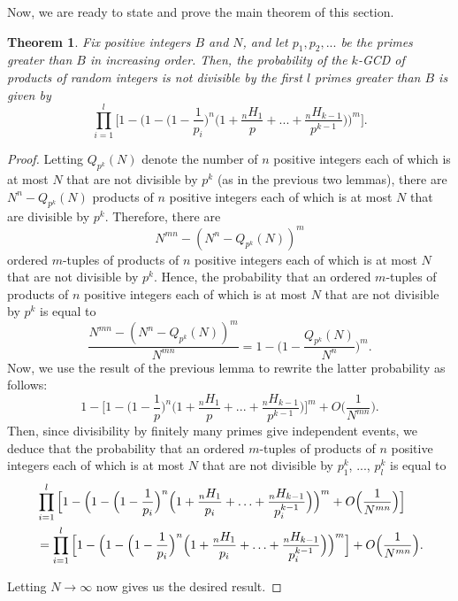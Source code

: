 \documentclass[12pt]{amsart}
\newtheorem{theorem}{Theorem}[subsection]
\theoremstyle{definition}
\begin{document}
Now, we are ready to state and prove the main theorem of this section.

\begin{theorem}
	Fix positive integers $B$ and $N$, and let $p_1, p_2, ...$ be the primes greater than $B$ in increasing order. Then, the probability of the $k$-GCD of products of random integers is not divisible by the first $l$ primes greater than $B$ is given by 
	$$\prod_{i=1}^{l} \Big[1 - \Big(1 - \Big(1-\frac{1}{p_i}\Big)^n \Big(1 + \frac{{}_nH_1}{p} + ... + \frac{{}_nH_{k-1}}{p^{k-1}}\Big)\Big)^m\Big].$$
\end{theorem}

\begin{proof}
	Letting $Q_{p^k}(N)$ denote the number of $n$ positive integers each of which is at most $N$ that are not divisible by $p^k$ (as in the previous two lemmas), there are $N^n - Q_{p^k}(N)$ products of $n$ positive integers each of which is at most $N$ that are divisible by $p^k$. Therefore, there are 
	$$N^{mn} - (N^n - Q_{p^k}(N))^m$$
	ordered $m$-tuples of products of $n$ positive integers each of which is at most $N$ that are not divisible by $p^k$.
	Hence, the probability that an ordered $m$-tuples of products of $n$ positive integers each of which is at most $N$ that are not divisible by $p^k$ is equal to
	$$\frac{N^{mn} - (N^n - Q_{p^k}(N))^m}{N^{mn}} = 1 - \Big(1 - \frac{Q_{p^k}(N)}{N^n}\Big)^m.$$
	Now, we use the result of the previous lemma to rewrite the latter probability as follows:
	$$1 - \Big[1 - \Big(1 - \frac{1}{p}\Big)^n \Big(1 + \frac{{}_nH_1}{p} + ... + \frac{{}_nH_{k-1}}{p^{k-1}}\Big)\Big]^m + O\Big(\frac{1}{N^{mn}}\Big).$$
	Then, since divisibility by finitely many primes give independent events, we deduce that the probability that an ordered $m$-tuples of products of $n$ positive integers each of which is at most $N$ that are not divisible by $p_1^k$, ..., $p_l^k$ is equal to
	\begin{align*} &\prod_{i=1}^l \Big[1 - \Big(1 -\Big(1-\frac{1}{p_i}\Big)^n\Big(1+\frac{{}_nH_1}{p_i}+\mathellipsis+\frac{{}_nH_{k-1}}{p_i^{k-1}}\Big)\Big)^m +O\Big(\frac{1}{N^{mn}}\Big) \Big]\\
		&=\prod_{i=1}^l \Big[1 - \Big(1 -\Big(1-\frac{1}{p_i}\Big)^n\Big(1+\frac{{}_nH_1}{p_i}+\mathellipsis+\frac{{}_nH_{k-1}}{p_i^{k-1}}\Big)\Big)^m\Big] + O\Big(\frac{1}{N^{mn}}\Big). \end{align*}
	
	\noindent Letting $N \to \infty$ now gives us the desired result.
\end{proof}
\end{document}
